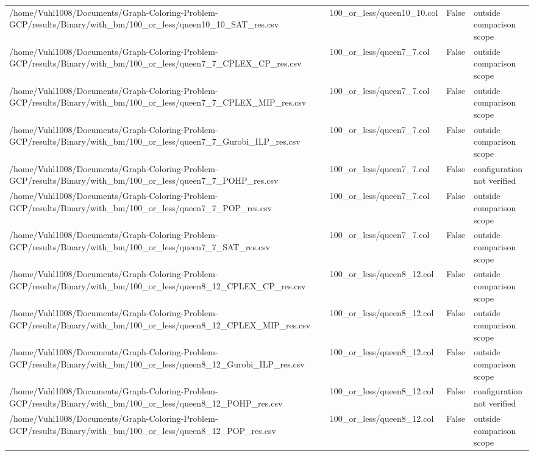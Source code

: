 \begin{table}[htbp]
\begin{tabular}{llll}
/home/Vuhl1008/Documents/Graph-Coloring-Problem-GCP/results/Binary/with\_bm/100\_or\_less/queen10\_10\_SAT\_res.csv & 100\_or\_less/queen10\_10.col & False & outside comparison scope \\
/home/Vuhl1008/Documents/Graph-Coloring-Problem-GCP/results/Binary/with\_bm/100\_or\_less/queen7\_7\_CPLEX\_CP\_res.csv & 100\_or\_less/queen7\_7.col & False & outside comparison scope \\
/home/Vuhl1008/Documents/Graph-Coloring-Problem-GCP/results/Binary/with\_bm/100\_or\_less/queen7\_7\_CPLEX\_MIP\_res.csv & 100\_or\_less/queen7\_7.col & False & outside comparison scope \\
/home/Vuhl1008/Documents/Graph-Coloring-Problem-GCP/results/Binary/with\_bm/100\_or\_less/queen7\_7\_Gurobi\_ILP\_res.csv & 100\_or\_less/queen7\_7.col & False & outside comparison scope \\
/home/Vuhl1008/Documents/Graph-Coloring-Problem-GCP/results/Binary/with\_bm/100\_or\_less/queen7\_7\_POHP\_res.csv & 100\_or\_less/queen7\_7.col & False & configuration not verified \\
/home/Vuhl1008/Documents/Graph-Coloring-Problem-GCP/results/Binary/with\_bm/100\_or\_less/queen7\_7\_POP\_res.csv & 100\_or\_less/queen7\_7.col & False & outside comparison scope \\
/home/Vuhl1008/Documents/Graph-Coloring-Problem-GCP/results/Binary/with\_bm/100\_or\_less/queen7\_7\_SAT\_res.csv & 100\_or\_less/queen7\_7.col & False & outside comparison scope \\
/home/Vuhl1008/Documents/Graph-Coloring-Problem-GCP/results/Binary/with\_bm/100\_or\_less/queen8\_12\_CPLEX\_CP\_res.csv & 100\_or\_less/queen8\_12.col & False & outside comparison scope \\
/home/Vuhl1008/Documents/Graph-Coloring-Problem-GCP/results/Binary/with\_bm/100\_or\_less/queen8\_12\_CPLEX\_MIP\_res.csv & 100\_or\_less/queen8\_12.col & False & outside comparison scope \\
/home/Vuhl1008/Documents/Graph-Coloring-Problem-GCP/results/Binary/with\_bm/100\_or\_less/queen8\_12\_Gurobi\_ILP\_res.csv & 100\_or\_less/queen8\_12.col & False & outside comparison scope \\
/home/Vuhl1008/Documents/Graph-Coloring-Problem-GCP/results/Binary/with\_bm/100\_or\_less/queen8\_12\_POHP\_res.csv & 100\_or\_less/queen8\_12.col & False & configuration not verified \\
/home/Vuhl1008/Documents/Graph-Coloring-Problem-GCP/results/Binary/with\_bm/100\_or\_less/queen8\_12\_POP\_res.csv & 100\_or\_less/queen8\_12.col & False & outside comparison scope \\

\end{tabular}
\end{table}
